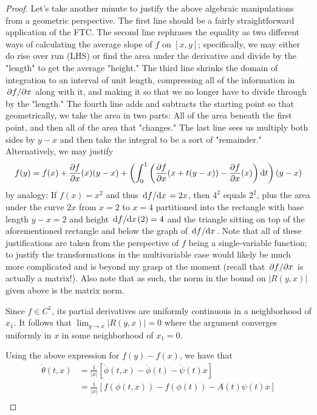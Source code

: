 \documentclass[../notes.tex]{subfiles}
\begin{document}
\begin{itemize}
\begin{proof}
        Let's take another minute to justify the above algebraic manipulations from a geometric perspective. The first line should be a fairly straightforward application of the FTC. The second line rephrases the equality as two different ways of calculating the average slope of $f$ on $[x,y]$; specifically, we may either do rise over run (LHS) or find the area under the derivative and divide by the "length" to get the average "height." The third line shrinks the domain of integration to an interval of unit length, compressing all of the information in $\pdv*{f}{x}$ along with it, and making it so that we no longer have to divide through by the "length." The fourth line adds and subtracts the starting point so that geometrically, we take the area in two parts: All of the area beneath the first point, and then all of the area that "changes." The last line sees us multiply both sides by $y-x$ and then take the integral to be a sort of "remainder." Alternatively, we may justify
        \begin{equation*}
            f(y) = f(x)+{\pdv{f}{x}}(x)(y-x)+\left( \int_0^1\left( {\pdv{f}{x}}(x+t(y-x))-{\pdv{f}{x}}(x) \right)\dd{t} \right)(y-x)
        \end{equation*}
        by analogy: If $f(x)=x^2$ and thus $\dv*{f}{x}=2x$, then $4^2$ equals $2^2$, plus the area under the curve $2x$ from $x=2$ to $x=4$ partitioned into the rectangle with base length $y-x=2$ and height ${\dv*{f}{x}}(2)=4$ and the triangle sitting on top of the aforementioned rectangle and below the graph of $\dv*{f}{x}$. Note that all of these justifications are taken from the perspective of $f$ being a single-variable function; to justify the transformations in the multivariable case would likely be much more complicated and is beyond my grasp at the moment (recall that $\pdv*{f}{x}$ is actually a matrix!). Also note that as such, the norm in the bound on $|R(y,x)|$ given above is the matrix norm.\par
        Since $f\in C^1$, its partial derivatives are uniformly continuous in a neighborhood of $x_1$. It follows that $\lim_{y\to x}|R(y,x)|=0$ where the argument converges uniformly in $x$ in some neighborhood of $x_1=0$.\par
        Using the above expression for $f(y)-f(x)$, we have that
        \begin{align*}
            \dot{\theta}(t,x) &= \frac{1}{|x|}[\dot{\phi}(t,x)-\dot{\phi}(t)-\dot{\psi}(t)x]\\
            &= \frac{1}{|x|}[f(\phi(t,x))-f(\phi(t))-A(t)\psi(t)x]\\

\end{align*}
\end{proof}
\end{itemize}
\end{document}
